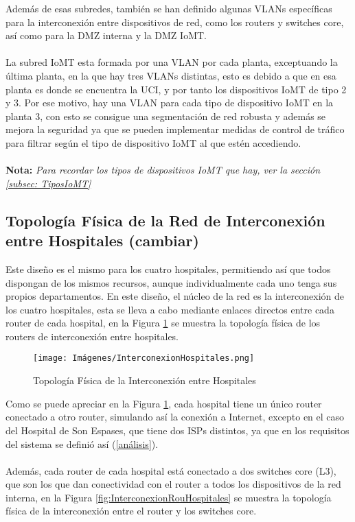 Además de esas subredes, también se han definido algunas VLANs específicas para la interconexión entre dispositivos de red, como los routers y switches core, así como para la DMZ interna y la DMZ IoMT.
\\ \\
La subred IoMT esta formada por una VLAN por cada planta, exceptuando la última planta, en la que hay tres VLANs distintas, esto es debido a que en esa planta es donde se encuentra la UCI, y por tanto los dispositivos IoMT de tipo 2 y 3.
Por ese motivo, hay una VLAN para cada tipo de dispositivo IoMT en la planta 3, con esto se consigue una segmentación de red robusta y además se mejora la seguridad ya que se pueden implementar medidas de control de tráfico para filtrar según el tipo de dispositivo IoMT al que estén accediendo.
\\ \\
{\small \textbf{Nota:} \textit{Para recordar los tipos de dispositivos IoMT que hay, ver la sección \ref{subsec: TiposIoMT}}}


\subsection{Topología Física de la Red de Interconexión entre Hospitales (cambiar)}
Este diseño es el mismo para los cuatro hospitales, permitiendo así que todos dispongan de los mismos recursos, aunque individualmente cada uno tenga sus propios departamentos.
En este diseño, el núcleo de la red es la interconexión de los cuatro hospitales, esta se lleva a cabo mediante enlaces directos entre cada router de cada hospital, en la Figura \ref{fig:InterconexionHospitales}
se muestra la topología física de los routers de interconexión entre hospitales.

\begin{figure}[H]
    \centering
    \texttt{[image: Imágenes/InterconexionHospitales.png]}
    \caption{Topología Física de la Interconexión entre Hospitales}
    \label{fig:InterconexionHospitales}
\end{figure}

Como se puede apreciar en la Figura \ref{fig:InterconexionHospitales}, cada hospital tiene un único router conectado a otro router, simulando así la conexión a Internet, excepto en el caso del Hospital de Son Espases, que 
tiene dos ISPs distintos, ya que en los requisitos del sistema se definió así (\ref{análisis}).
\\ \\
Además, cada router de cada hospital está conectado a dos switches core (L3), que son los que dan conectividad con el router a todos los dispositivos de la red interna, en la Figura 
\ref{fig:InterconexionRouHospitales} se muestra la topología física de la interconexión entre el router y los switches core. 

